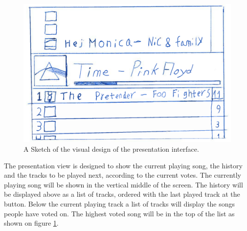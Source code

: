 \begin{figure}[hbtp]
  \centering
  \includegraphics[width=1.0\linewidth]{Images/presentationInterface.png}
  \caption{A Sketch of the visual design of the presentation interface.}\label{fig:presentation}
\end{figure}

The presentation view is designed to show the current playing song, the history and the tracks to be played next, according to the current votes. The currently playing song will be shown in the vertical middle of the screen. The history will be displayed above as a list of tracks, ordered with the last played track at the button. Below the current playing track a list of tracks will display the songs people have voted on. The highest voted song will be in the top of the list as shown on figure \cref{fig:presentation}. 


